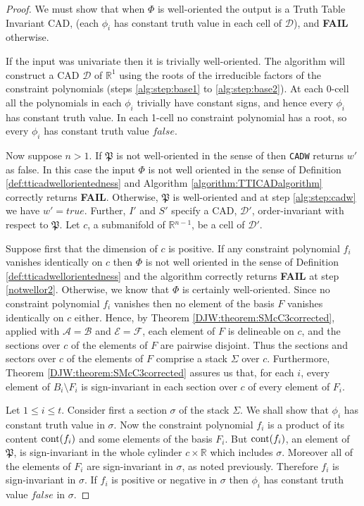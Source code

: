 \documentclass{article}
\def\R {\ensuremath{\mathbb{R}}}
\begin{document}
\begin{proof}
We must show that when $\Phi$ is well-oriented the output is a Truth Table Invariant CAD, (each $\phi_i$ has constant truth value in each cell of $\mathcal{D}$), and \textbf{FAIL} otherwise.

If the input was univariate then it is trivially well-oriented.  The algorithm will construct a CAD $\mathcal{D}$ of $\R^1$ using the roots of the irreducible factors of the constraint polynomials (steps \ref{alg:step:base1} to \ref{alg:step:base2}).
At each 0-cell all the polynomials in each $\phi_i$ trivially have constant signs, and hence every $\phi_i$ has constant truth value.  In each 1-cell no constraint polynomial has a root, so every $\phi_i$ has constant truth value $false$.

Now suppose $n > 1$.  
If $\mathfrak{P}$ is not well-oriented in the sense of \cite{McCallum1998} then \texttt{CADW} returns $w'$ as false.  In this case the input $\Phi$ is not well oriented in the sense of Definition \ref{def:tticadwellorientedness} and Algorithm \ref{algorithm:TTICADalgorithm} correctly returns \textbf{FAIL}.  Otherwise, $\mathfrak{P}$ is well-oriented and at step \ref{alg:step:cadw} we have $w'= true$.  Further, $I'$ and $S'$ specify a CAD, $\mathcal{D}'$, order-invariant with respect to $\mathfrak{P}$.
Let $c$, a submanifold of $\R{}^{n-1}$, be a cell of $\mathcal{D}'$.

Suppose first that the dimension of $c$ is positive.
If any constraint polynomial $f_i$ vanishes identically on $c$ then $\Phi$ is not well oriented in the sense of Definition \ref{def:tticadwellorientedness} and the algorithm correctly returns \textbf{FAIL} at step \ref{notwellor2}.  
Otherwise, we know that $\Phi$ is certainly well-oriented.  Since no constraint polynomial $f_i$ vanishes then no element of the basis $F$ vanishes identically on $c$ either.  Hence, by Theorem \ref{DJW:theorem:SMcC3corrected}, applied with $\mathcal{A} = \mathcal{B}$ and $\mathcal{E} = \mathcal{F}$, each element of $F$ is delineable on $c$, and the sections over $c$ of the elements of $F$ are pairwise disjoint.
Thus the sections and sectors over $c$ of the elements of $F$ comprise
a stack $\Sigma$ over $c$.  Furthermore, Theorem \ref{DJW:theorem:SMcC3corrected} assures us that, for each $i$, every element of $B_i \setminus F_i$ is sign-invariant in each section over $c$ of every element of $F_i$.

Let $1 \le i \le t$. Consider first a section $\sigma$ of the stack $\Sigma$.
We shall show that $\phi_i$ has constant truth value in $\sigma$.
Now the constraint polynomial $f_i$ is a product of its content ${\rm cont}(f_i)$ 
and some elements of the basis $F_i$.
But ${\rm cont}(f_i)$, an element of $\mathfrak{P}$,
is sign-invariant in the whole cylinder $c \times \R$ which includes $\sigma$. Moreover all of the elements of $F_i$ are sign-invariant in $\sigma$, as noted previously. Therefore $f_i$ is sign-invariant in $\sigma$.
If $f_i$ is positive or negative in $\sigma$ then
$\phi_i$ has constant truth value $false$ in $\sigma$.


\end{proof}
\end{document}
